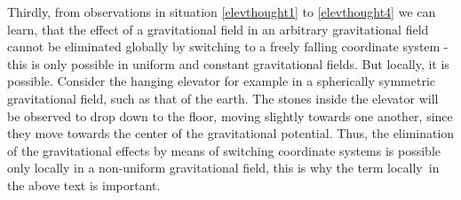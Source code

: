 \documentclass[a4paper,11pt]{article}
\numberwithin{equation}{section}
\begin{document}
{Thirdly, from observations in situation \ref{elevthought1} to \ref{elevthought4} we can learn, that the effect of a gravitational field in an arbitrary gravitational field cannot be eliminated globally by switching to a freely falling coordinate system - this is only possible in uniform and constant gravitational fields. But locally, it is possible. Consider the hanging elevator for example in a spherically symmetric gravitational field, such as that of the earth. The stones inside the elevator will be observed to drop down to the floor, moving slightly towards one another, since they move towards the center of the gravitational potential. Thus, the elimination of the gravitational effects by means of switching coordinate systems is possible only locally in a non-uniform gravitational field, this is why the term \flqq locally\frqq\ in the above text is important.
}
\end{document}
